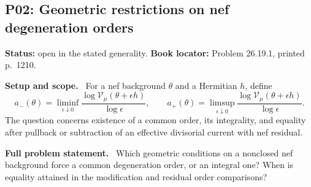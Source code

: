 \documentclass[11pt]{article}
\newcommand{\field}[1]{\par\medskip\noindent\textbf{#1.}\ }
\begin{document}
\subsection{P02: Geometric restrictions on nef degeneration orders}
\label{P02}
\noindent\textbf{Status:} open in the stated generality. \textbf{Book locator:} Problem 26.19.1, printed p.~1210.
\field{Setup and scope} For a nef background $\theta$ and a Hermitian $h$, define
\[a_-(\theta)=\liminf_{\epsilon\downarrow0}\frac{\log\mathcal V_\mu(\theta+\epsilon h)}{\log\epsilon},\qquad
 a_+(\theta)=\limsup_{\epsilon\downarrow0}\frac{\log\mathcal V_\mu(\theta+\epsilon h)}{\log\epsilon}.\]
The question concerns existence of a common order, its integrality, and equality after pullback or subtraction of an effective divisorial current with nef residual.
\field{Full problem statement} Which geometric conditions on a nonclosed nef background force a common degeneration order, or an integral one? When is equality attained in the modification and residual order comparisons?
\end{document}
